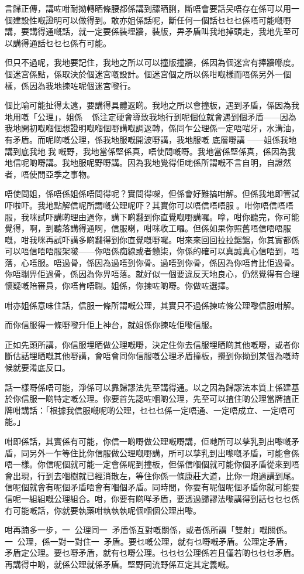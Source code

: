 言歸正傳，講咗咁耐拗轉晒條腰都係講到𦧲晒脷，斷唔會要話㕦唔存在係可以用一個建設性嘅證明可以做得到。敢亦姐係話呢，斷任何一個話乜乜乜係唔可能嘅嘢講，要講得通嘅話，就一定要係裝埋牆，裝版，畀矛盾叫我地掉頭走，我地先至可以講得通話乜乜乜係冇可能。

但只不過呢，我地要記住，我地之所以可以撞版撞牆，係因為個迷宮有捧牆喺度。個迷宮係點，係取決於個迷宮嘅設計。個迷宮個之所以係咁嘅樣而唔係另外一個樣，係因為我地揀咗呢個迷宮嚟行。

個比喻可能扯得太遠，要講得具體返啲。我地之所以會撞板，遇到矛盾，係因為我地用嘅「公理」，姐係，係注定硬會導致我地行到呢個位就會遇到個矛盾——因為我地開初嘅嗰個想證明嘅嗰個嘢講嘅調返轉，係同乍公理係一定唔啱牙，水溝油，有矛盾。而呢啲嘅公理，係我地服嘅開波嘢講，我地服嘅 底層嘢講 ——姐係我地講到底我地󰇞我嘅野，我地當係堅係真，唔使問嘅嘢。我地當係堅係真，係因為我地信呢啲嘢講。我地服呢野嘢講。因為我地覺得佢哋係所謂嘅不言自明，自證然者，唔使問亞季之事物。

唔使問姐，係唔係姐係唔問得呢？實問得㗎，但係會好難搞咁解。但係我地即管試吓啦吓。我地點解信呢所謂嘅公理呢吓？其實你可以唔信唔唔服。咁你唔信唔唔服，我咪試吓講啲理由過你，講下啲蠽到你直覺嘅嘢講囉。嗱，咁你聽完，你可能覺得，啊，到聽落講得通啊，信服喇，咁咪收工囉。但係如果你照舊唔信唔唔服嘅，咁我咪再試吓講多啲蠽得到你直覺嘅嘢囉。咁來來回回拉拉鋸鋸，你其實都係可以唔信唔唔服架啵——你唔係痴線或者戇柒，你係的確可以真誠真心信唔到，唔落，心唔服。唔過骨，係因為過唔到你骨。過唔到你骨，係因為你唔肯比佢過骨。你唔䎺畀佢過骨，係因為你畀唔落。就好似一個要違反天地良心，仍然覺得有合理懷疑嘅陪審員，你唔肯唔䎺。姐係，你揀咗啲嘢。你做咗選擇。

咁亦姐係意味住話，信服一條所謂嘅公理，其實只不過係揀咗條公理嚟信服咁解。

而你信服得一條嘢嚟升佢上神台，就姐係你揀咗佢嚟信服。

正如先頭所講，你信服埋晒做公理嘅嘢，決定住你去信服埋晒啲其他嘅嘢，或者你斷估話埋晒嘅其他嘢講，會唔會同你信服嘅公理矛盾撞板，攪到你拗到某個為嘅時候就要淆底反口。

話一樣嘢係唔可能，淨係可以靠歸謬法先至講得通。以之因為歸謬法本質上係建基於你信服一啲特定嘅公理。你要首先認咗嗰啲公理，先至可以揸住啲公理當牌揸正牌咁講話：「根據我信服嘅呢啲公理，乜乜乜係一定唔通、一定唔成立、一定唔可能。」

咁即係話，其實係有可能，你信一啲嘢做公理嘅嘢講，佢哋所可以孳乳到出嚟嘅矛盾，同另外一乍等住比你信服做公理嘅嘢講，所可以孳乳到出嚟嘅矛盾，可能會係唔一樣。你信呢個就可能一定會係呢到撞板，但係信嗰個就可能你個矛盾從來到唔會出現，行到去嗰樹就已經消散左，等住你係一條康莊大道，比你一炮過講到尾。信呢個就會有呢個矛盾唔會有嗰個矛盾。同時間，你要有呢個呢個矛盾你就可能要信呢一組組嘅公理組合。咁，你要有啲咩矛盾，要透過歸謬法嚟講得到話乜乜乜係冇可能嘅話，你就要執藥咁執執執呢個嗰個公理出嚟。

咁再𨂾多一步，一󱝚公理同一󱝚矛盾係互對嘅關係，或者係所謂「雙射」嘅關係。一󱝚公理，係一對一對住一󱝚矛盾。要乜嘅公理，就有乜嘢嘅矛盾。公理定矛盾，矛盾定公理。要乜嘢矛盾，就有乜嘢公理。乜乜乜公理係若且僅若啲乜乜乜矛盾。再講得中啲，就係公理就係矛盾。堅野同流野係互定其定義嘅。
